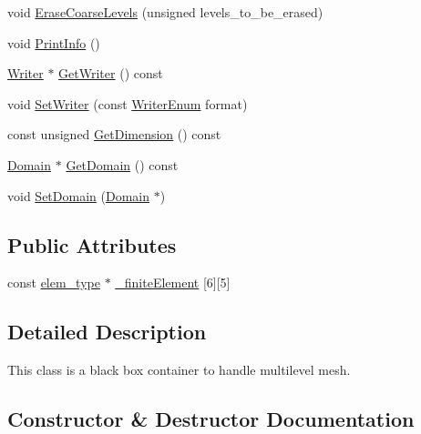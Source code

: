 \begin{DoxyCompactItemize}
\item 
void \mbox{\hyperlink{classfemus_1_1_multi_level_mesh_ac474afe18c6be4e181b2bb72695f57e9}{Erase\+Coarse\+Levels}} (unsigned levels\+\_\+to\+\_\+be\+\_\+erased)
\item 
void \mbox{\hyperlink{classfemus_1_1_multi_level_mesh_a09c12975f18035d5369ae411c0208648}{Print\+Info}} ()
\item 
\mbox{\hyperlink{classfemus_1_1_writer}{Writer}} $\ast$ \mbox{\hyperlink{classfemus_1_1_multi_level_mesh_ae865ea126e5a770d25f6b2cd255effd6}{Get\+Writer}} () const
\item 
void \mbox{\hyperlink{classfemus_1_1_multi_level_mesh_a90af74edd9ccffa09e9f963d0f15d923}{Set\+Writer}} (const \mbox{\hyperlink{_writer_enum_8hpp_a18b827c3c1f62b8a57febdcad0c871a8}{Writer\+Enum}} format)
\item 
const unsigned \mbox{\hyperlink{classfemus_1_1_multi_level_mesh_a65dabdf1e308c1a44ebe5c6a41d09284}{Get\+Dimension}} () const
\item 
\mbox{\hyperlink{classfemus_1_1_domain}{Domain}} $\ast$ \mbox{\hyperlink{classfemus_1_1_multi_level_mesh_a12fb14206d4b1329cd18b828d6a20b17}{Get\+Domain}} () const
\item 
void \mbox{\hyperlink{classfemus_1_1_multi_level_mesh_a1ecf10a71cc3a93dd89ded57adf55043}{Set\+Domain}} (\mbox{\hyperlink{classfemus_1_1_domain}{Domain}} $\ast$)
\end{DoxyCompactItemize}
\subsection*{Public Attributes}
\begin{DoxyCompactItemize}
\item 
const \mbox{\hyperlink{classfemus_1_1elem__type}{elem\+\_\+type}} $\ast$ \mbox{\hyperlink{classfemus_1_1_multi_level_mesh_a4ec0caf1cf059019f1b7044c1d733064}{\+\_\+finite\+Element}} \mbox{[}6\mbox{]}\mbox{[}5\mbox{]}
\end{DoxyCompactItemize}


\subsection{Detailed Description}
This class is a black box container to handle multilevel mesh. 

\subsection{Constructor \& Destructor Documentation}
\mbox{\label{classfemus_1_1_multi_level_mesh_ad33747ccef17dbd00993b7cc5c0dc2e7}} 
